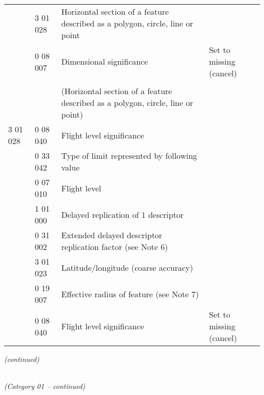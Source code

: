 \begin{longtable}[]{@{}llll@{}}
& 3 01 028 & Horizontal section of a feature described as a polygon, circle, line or point &\tabularnewline
& 0 08 007 & Dimensional significance & Set to missing (cancel)\tabularnewline
& & &\tabularnewline
& & (Horizontal section of a feature described as a polygon, circle, line or point) &\tabularnewline
3 01 028 & 0 08 040 & Flight level significance &\tabularnewline
& 0 33 042 & Type of limit represented by following value &\tabularnewline
& 0 07 010 & Flight level &\tabularnewline
& 1 01 000 & Delayed replication of 1 descriptor &\tabularnewline
& 0 31 002 & Extended delayed descriptor replication factor (see Note 6) &\tabularnewline
& 3 01 023 & Latitude/longitude (coarse accuracy) &\tabularnewline
& 0 19 007 & Effective radius of feature (see Note 7) &\tabularnewline
& 0 08 040 & Flight level significance & Set to missing (cancel)\tabularnewline
\bottomrule
\end{longtable}

\emph{(continued)}

\emph{\\
(Category 01 -- continued)}

